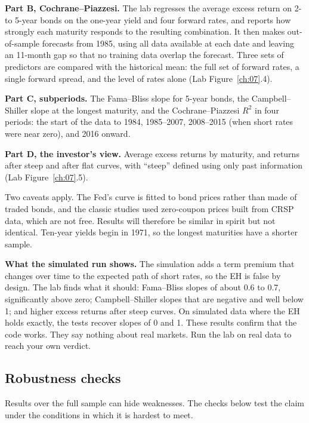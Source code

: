 \textbf{Part B, Cochrane--Piazzesi.} The lab regresses the average excess return on 2- to 5-year bonds on the one-year yield and four forward rates, and reports how strongly each maturity responds to the resulting combination. It then makes out-of-sample forecasts from 1985, using all data available at each date and leaving an 11-month gap so that no training data overlap the forecast. Three sets of predictors are compared with the historical mean: the full set of forward rates, a single forward spread, and the level of rates alone (Lab Figure~\ref{ch:07}.4).

\textbf{Part C, subperiods.} The Fama--Bliss slope for 5-year bonds, the Campbell--Shiller slope at the longest maturity, and the Cochrane--Piazzesi $R^2$ in four periods: the start of the data to 1984, 1985--2007, 2008--2015 (when short rates were near zero), and 2016 onward.

\textbf{Part D, the investor's view.} Average excess returns by maturity, and returns after steep and after flat curves, with ``steep'' defined using only past information (Lab Figure~\ref{ch:07}.5).

Two caveats apply. The Fed's curve is fitted to bond prices rather than made of traded bonds, and the classic studies used zero-coupon prices built from CRSP data, which are not free. Results will therefore be similar in spirit but not identical. Ten-year yields begin in 1971, so the longest maturities have a shorter sample.

\textbf{What the simulated run shows.} The simulation adds a term premium that changes over time to the expected path of short rates, so the EH is false by design. The lab finds what it should: Fama--Bliss slopes of about 0.6 to 0.7, significantly above zero; Campbell--Shiller slopes that are negative and well below 1; and higher excess returns after steep curves. On simulated data where the EH holds exactly, the tests recover slopes of 0 and 1. These results confirm that the code works. They say nothing about real markets. Run the lab on real data to reach your own verdict.

\subsection{Robustness checks}
\label{sec:07-stress}

Results over the full sample can hide weaknesses. The checks below test the claim under the conditions in which it is hardest to meet.

